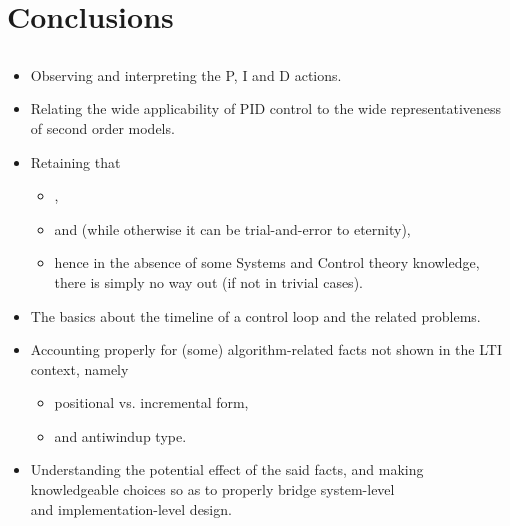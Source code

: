 \section{Conclusions}
\subsection{}

\begin{frame}
\myPause
 \begin{itemize}[<+-| alert@+>]
 \item Observing and interpreting the P, I and D actions.
 \item Relating the wide applicability of PID control to the wide representativeness of second order models.
 \item Retaining that
       \begin{itemize}[<+-| alert@+>]
       \item {},
       \item and  (while otherwise it can be trial-and-error to eternity),
       \item hence in the absence of some Systems and Control theory knowledge,\\
             there is simply no way out (if not in trivial cases).      
       \end{itemize}
 \end{itemize}
\end{frame}

\begin{frame}
\myPause
 \begin{itemize}[<+-| alert@+>]
 \item The basics about the timeline of a control loop and the related problems.
 \item Accounting properly for (some) algorithm-related facts not shown in the LTI context, namely
       \begin{itemize}[<+-| alert@+>]
       \item positional vs. incremental form,
       \item and antiwindup type.
       \end{itemize}
 \item Understanding the potential effect of the said facts, and making\\
       knowledgeable choices so as to properly bridge system-level\\
       and implementation-level design.
 \end{itemize}
\end{frame}

